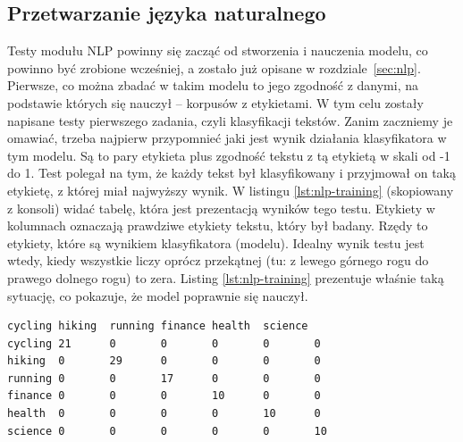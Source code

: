 \documentclass[titlepage]{article}
\begin{document}
\subsection{Przetwarzanie języka naturalnego}
Testy modułu NLP powinny się zacząć od stworzenia i nauczenia modelu, co powinno być zrobione wcześniej, a zostało już opisane w rozdziale~\ref{sec:nlp}. Pierwsze, co można zbadać w takim modelu to jego zgodność z danymi, na podstawie których się nauczył -- korpusów z etykietami. W tym celu zostały napisane testy pierwszego zadania, czyli klasyfikacji tekstów. Zanim zaczniemy je omawiać, trzeba najpierw przypomnieć jaki jest wynik działania klasyfikatora w tym modelu. Są to pary etykieta plus zgodność tekstu z tą etykietą w skali od -1 do 1. Test polegał na tym, że każdy tekst był klasyfikowany i przyjmował on taką etykietę, z której miał najwyższy wynik. W listingu \ref{lst:nlp-training} (skopiowany z konsoli) widać tabelę, która jest prezentacją wyników tego testu. Etykiety w kolumnach oznaczają prawdziwe etykiety tekstu, który był badany. Rzędy to etykiety, które są wynikiem klasyfikatora (modelu). Idealny wynik testu jest wtedy, kiedy wszystkie liczy oprócz przekątnej (tu: z lewego górnego rogu do prawego dolnego rogu) to zera. Listing \ref{lst:nlp-training} prezentuje właśnie taką sytuację, co pokazuje, że model poprawnie się nauczył.

\begin{lstlisting}[frame=single,
stepnumber=1,
numbersep=10pt,
tabsize=4,
showspaces=false,
showstringspaces=false,
label=lst:nlp-training,
caption=Wynik testu dla tekstów treningowych]
		cycling	hiking	running	finance	health	science	
cycling	21		0		0		0		0		0		
hiking	0		29		0		0		0		0		
running	0		0		17		0		0		0		
finance	0		0		0		10		0		0		
health	0		0		0		0		10		0		
science	0		0		0		0		0		10			
\end{lstlisting}
\end{document}
